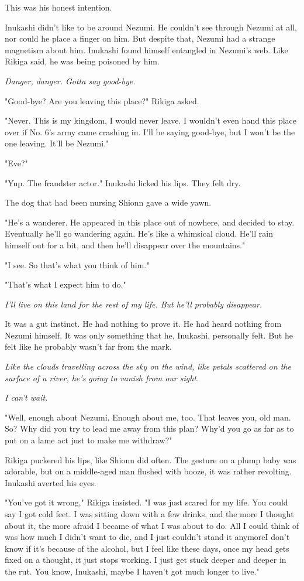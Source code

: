 This was his honest intention.

Inukashi didn't like to be around Nezumi. He couldn't see through Nezumi
at all, nor could he place a finger on him. But despite that, Nezumi had
a strange magnetism about him. Inukashi found himself entangled in
Nezumi's web. Like Rikiga said, he was being poisoned by him.

\emph{Danger, danger. Gotta say good-bye.}

"Good-bye? Are you leaving this place?" Rikiga asked.

"Never. This is my kingdom, I would never leave. I wouldn't even hand
this place over if No. 6's army came crashing in. I'll be saying
good-bye, but I won't be the one leaving. It'll be Nezumi."

"Eve?"

"Yup. The fraudster actor." Inukashi licked his lips. They felt dry.

The dog that had been nursing Shionn gave a wide yawn.

"He's a wanderer. He appeared in this place out of nowhere, and decided
to stay. Eventually he'll go wandering again. He's like a whimsical
cloud. He'll rain himself out for a bit, and then he'll disappear over
the mountains."

"I see. So that's what you think of him."

"That's what I expect him to do."

\emph{I'll live on this land for the rest of my life. But he'll probably
disappear.}

It was a gut instinct. He had nothing to prove it. He had heard nothing
from Nezumi himself. It was only something that he, Inukashi, personally
felt. But he felt like he probably wasn't far from the mark.

\emph{Like the clouds travelling across the sky on the wind, like petals
scattered on the surface of a river, he's going to vanish from our
sight.}

\emph{I can't wait.}

"Well, enough about Nezumi. Enough about me, too. That leaves you, old
man. So? Why did you try to lead me away from this plan? Why'd you go as
far as to put on a lame act just to make me withdraw?"

Rikiga puckered his lips, like Shionn did often. The gesture on a plump
baby was adorable, but on a middle-aged man flushed with booze, it was
rather revolting. Inukashi averted his eyes.

"You've got it wrong," Rikiga insisted. "I was just scared for my life.
You could say I got cold feet. I was sitting down with a few drinks, and
the more I thought about it, the more afraid I became of what I was
about to do. All I could think of was how much I didn't want to die, and
I just couldn't stand it anymore\el I don't know if it's because of the
alcohol, but I feel like these days, once my head gets fixed on a
thought, it just stops working. I just get stuck deeper and deeper in
the rut. You know, Inukashi, maybe I haven't got much longer to live."

